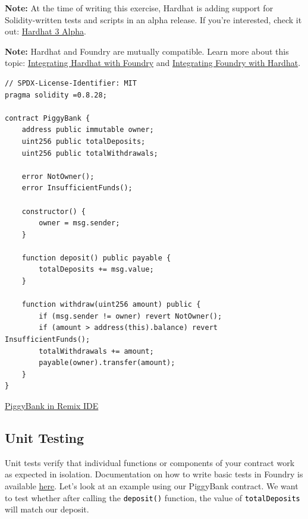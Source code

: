 \documentclass[12pt]{article}
\newcommand{\codegrey}[1]{%
  \texttt{\colorbox{black!4}{\textcolor{black}{#1}}}%
}
\begin{document}
\medskip
\noindent
\textbf{Note:} At the time of writing this exercise, Hardhat is adding support for Solidity-written tests and scripts in an alpha release. If you're interested, check it out: \href{https://hardhat.org/hardhat3-alpha}{Hardhat 3 Alpha}.

\medskip
\noindent
\textbf{Note:} Hardhat and Foundry are mutually compatible. Learn more about this topic: \href{https://hardhat.org/hardhat-runner/docs/advanced/hardhat-and-foundry#integrating-with-foundry}{Integrating Hardhat with Foundry} and \href{https://book.getfoundry.sh/config/hardhat}{Integrating Foundry with Hardhat}.

\noindent \begin{minipage}{\textwidth}
    \begin{lstlisting}[language=Solidity]
// SPDX-License-Identifier: MIT
pragma solidity =0.8.28;

contract PiggyBank {
    address public immutable owner;
    uint256 public totalDeposits;
    uint256 public totalWithdrawals;
    
    error NotOwner();
    error InsufficientFunds();
    
    constructor() {
        owner = msg.sender;
    }
    
    function deposit() public payable {
        totalDeposits += msg.value;
    }
  
    function withdraw(uint256 amount) public {
        if (msg.sender != owner) revert NotOwner();
        if (amount > address(this).balance) revert InsufficientFunds();
        totalWithdrawals += amount;
        payable(owner).transfer(amount);
    }
}
\end{lstlisting}
\end{minipage}

\medskip
\noindent
\href{https://remix.ethereum.org/?#activate=solidity&url=https://github.com/radovluk/unbreakable-vault/contracts/PiggyBank.sol&lang=en&optimize=false&runs=200&evmVersion=null&version=soljson-v0.8.28+commit.7893614a.js}{PiggyBank in Remix IDE}

\subsection{Unit Testing}

Unit tests verify that individual functions or components of your contract work
as expected in isolation. Documentation on how to write basic tests in Foundry
is available \href{https://book.getfoundry.sh/forge/writing-tests}{here}. Let's
look at an example using our PiggyBank contract. We want to test whether after
calling the \codegrey{deposit()} function, the value of
\codegrey{totalDeposits} will match our deposit.
\end{document}
